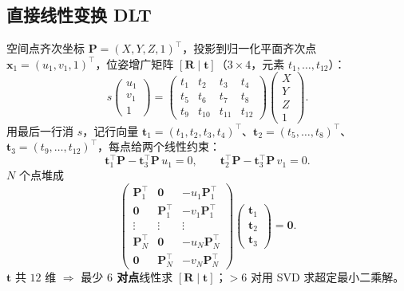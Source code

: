 \subsection{直接线性变换 DLT}
\label{sec:vo-pnp-dlt}

\begin{derivation}
\label{thm:vo-dlt}
空间点齐次坐标 $\mathbf{P}=(X,Y,Z,1)^\top$，投影到归一化平面齐次点 $\mathbf{x}_1=(u_1,v_1,1)^\top$，位姿增广矩阵 $[\mathbf{R}\mid\mathbf{t}]$（$3\times4$，元素 $t_1,\dots,t_{12}$）\cite{gaoxiang2019slam14}：
\begin{equation}
  s\begin{pmatrix}u_1\\v_1\\1\end{pmatrix}=
  \begin{pmatrix}t_1&t_2&t_3&t_4\\t_5&t_6&t_7&t_8\\t_9&t_{10}&t_{11}&t_{12}\end{pmatrix}
  \begin{pmatrix}X\\Y\\Z\\1\end{pmatrix}.
  \label{eq:vo-dlt-eq}
\end{equation}
用最后一行消 $s$，记行向量 $\mathbf{t}_1=(t_1,t_2,t_3,t_4)^\top$、$\mathbf{t}_2=(t_5,\dots,t_8)^\top$、$\mathbf{t}_3=(t_9,\dots,t_{12})^\top$，每点给两个线性约束：
\begin{equation}
  \mathbf{t}_1^\top\mathbf{P}-\mathbf{t}_3^\top\mathbf{P}\,u_1=0,\qquad
  \mathbf{t}_2^\top\mathbf{P}-\mathbf{t}_3^\top\mathbf{P}\,v_1=0.
  \label{eq:vo-dlt-constraint}
\end{equation}
$N$ 个点堆成
\begin{equation}
  \begin{pmatrix}
  \mathbf{P}_1^\top & \mathbf{0} & -u_1\mathbf{P}_1^\top\\
  \mathbf{0} & \mathbf{P}_1^\top & -v_1\mathbf{P}_1^\top\\
  \vdots & \vdots & \vdots\\
  \mathbf{P}_N^\top & \mathbf{0} & -u_N\mathbf{P}_N^\top\\
  \mathbf{0} & \mathbf{P}_N^\top & -v_N\mathbf{P}_N^\top
  \end{pmatrix}
  \begin{pmatrix}\mathbf{t}_1\\\mathbf{t}_2\\\mathbf{t}_3\end{pmatrix}=\mathbf{0}.
  \label{eq:vo-dlt-sys}
\end{equation}
$\mathbf{t}$ 共 $12$ 维 $\Rightarrow$ 最少 \textbf{$6$ 对点}线性求 $[\mathbf{R}\mid\mathbf{t}]$；$>6$ 对用 SVD 求超定最小二乘解。
\end{derivation}


